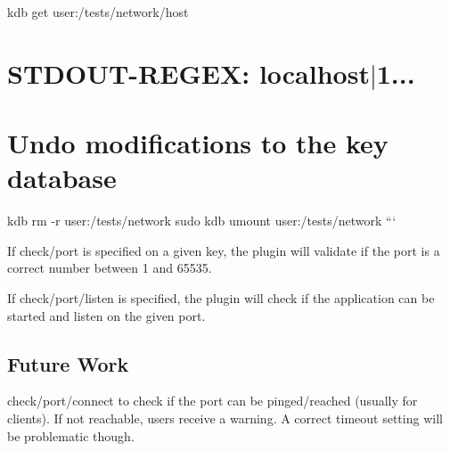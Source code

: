 kdb get user\+:/tests/network/host \hypertarget{autotoc_md453_autotoc_md466}{}\section{S\+T\+D\+O\+U\+T-\/\+R\+E\+G\+E\+X\+: localhost$\vert$1...}\label{autotoc_md453_autotoc_md466}
\hypertarget{autotoc_md453_autotoc_md467}{}\section{Undo modifications to the key database}\label{autotoc_md453_autotoc_md467}
kdb rm -\/r user\+:/tests/network sudo kdb umount user\+:/tests/network ```

If {\ttfamily check/port} is specified on a given key, the plugin will validate if the port is a correct number between 1 and 65535.

If {\ttfamily check/port/listen} is specified, the plugin will check if the application can be started and listen on the given port.\hypertarget{autotoc_md453_autotoc_md468}{}\subsection{Future Work}\label{autotoc_md453_autotoc_md468}
{\ttfamily check/port/connect} to check if the port can be pinged/reached (usually for clients). If not reachable, users receive a warning. A correct timeout setting will be problematic though. 